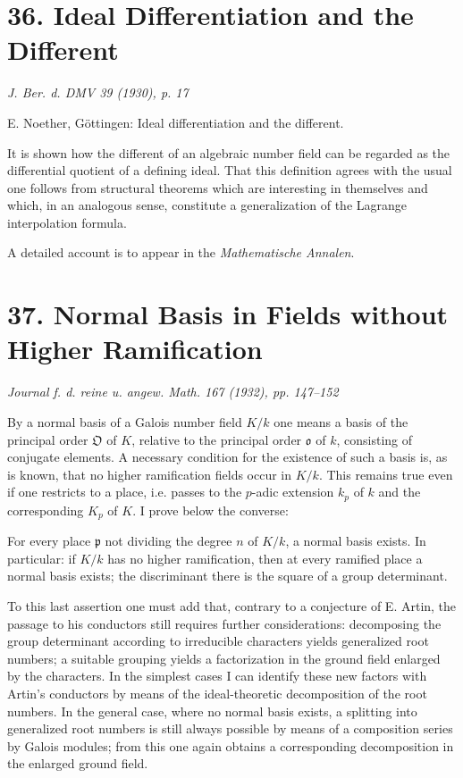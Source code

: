 \documentclass[11pt]{article}
\providecommand{\frako}{\mathfrak o}
\providecommand{\frakp}{\mathfrak p}
\providecommand{\frakO}{\mathfrak O}
\begin{document}
\section*{36. Ideal Differentiation and the Different}

\begin{center}
\emph{J. Ber. d. DMV 39 (1930), p. 17}
\end{center}

E. Noether, Göttingen: Ideal differentiation and the different.

It is shown how the different of an algebraic number field can be regarded as the differential quotient of a defining ideal. That this definition agrees with the usual one follows from structural theorems which are interesting in themselves and which, in an analogous sense, constitute a generalization of the Lagrange interpolation formula.

A detailed account is to appear in the \emph{Mathematische Annalen}.

\section*{37. Normal Basis in Fields without Higher Ramification}

\begin{center}
\emph{Journal f. d. reine u. angew. Math. 167 (1932), pp. 147--152}
\end{center}

By a normal basis of a Galois number field \(K/k\) one means a basis of the principal order \(\frakO\) of \(K\), relative to the principal order \(\frako\) of \(k\), consisting of conjugate elements. A necessary condition for the existence of such a basis is, as is known, that no higher ramification fields occur in \(K/k\). This remains true even if one restricts to a place, i.e. passes to the \(p\)-adic extension \(k_p\) of \(k\) and the corresponding \(K_p\) of \(K\). I prove below the converse:

For every place \(\frakp\) not dividing the degree \(n\) of \(K/k\), a normal basis exists. In particular: if \(K/k\) has no higher ramification, then at every ramified place a normal basis exists; the discriminant there is the square of a group determinant.

To this last assertion one must add that, contrary to a conjecture of E. Artin, the passage to his conductors still requires further considerations: decomposing the group determinant according to irreducible characters yields generalized root numbers; a suitable grouping yields a factorization in the ground field enlarged by the characters. In the simplest cases I can identify these new factors with Artin's conductors by means of the ideal-theoretic decomposition of the root numbers. In the general case, where no normal basis exists, a splitting into generalized root numbers is still always possible by means of a composition series by Galois modules; from this one again obtains a corresponding decomposition in the enlarged ground field.
\end{document}
